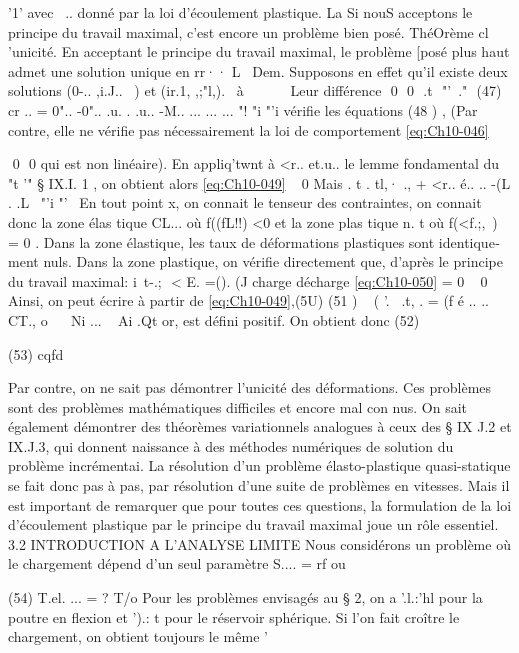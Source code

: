 '1'
avec ~.. donné par la loi d'écoulement plastique.
La 
Si nouS acceptons le principe du travail maximal, c'est encore 
un problème bien posé. 
ThéOrème cl 'unicité. En acceptant le principe du travail maximal, le problème [posé plus haut admet une solution unique en rr·· 
L~ 
Dem. Supposons en effet qu'il existe deux solutions (0-.. ,i.J..~ ) et (ir.1, ,;"l,).
~à ~ ~~ ~ 
Leur différence 
 0  0  .t  "'\
." 
(47) cr .. = 0".. -0".. .u. . .u.. -M.. 
... ... ...
"! "i "'i 
vérifie les équations 
(48 ) , 
(Par contre, elle ne vérifie pas nécessairement la loi de comportement \eqref{eq:Ch10-046} 

 0  0 
qui est non linéaire). En appliq'twnt à <r.. et.u.. le lemme fondamental du "t '" 
§ IX.I. 1 , on obtient alors 
\eqref{eq:Ch10-049} ~ 0 Mais 
. t . tl,· .,
+ <r.. é.. .. -(L . 
.L~ "'i "'~ 
En tout point x, on connait le tenseur des contraintes, on connait donc la 
zone élas tique CL... où f((fL!!) <0 et la zone plas tique n. t où f(<f.;,~) = 0 . 
Dans la zone élastique, les taux de déformations plastiques sont identique­
ment nuls. Dans la zone plastique, on vérifie directement que, d'après le 
principe du travail maximal: 
i\
t-.;  < E. =(). 
(J 
charge décharge 
\eqref{eq:Ch10-050} = 0 ~ 0 
Ainsi, on peut écrire à partir de \eqref{eq:Ch10-049},(5U) 
(51 ) 
~
( 
'.~ .t, . 
= (f é .. .. CT., o
~~ Ni ... ~ Ai
.Qt 
or, est défini positif. On obtient donc 
(52) 

(53) 
cqfd 


Par contre, on ne sait pas démontrer l'unicité des déformations. 
Ces problèmes sont des problèmes mathématiques difficiles et encore mal con­
nus. 
On sait également démontrer des théorèmes variationnels analogues à ceux des § IX J.2 et IX.J.3, qui donnent naissance à des méthodes numéri­ques de solution du problème incrémentai. La résolution d'un problème élas­to-plastique quasi-statique se fait donc pas à pas, par résolution d'une suite de problèmes en vitesses. Mais il est important de remarquer que pour toutes ces questions, la formulation de la loi d'écoulement plastique par le principe du travail maximal joue un rôle essentiel. 
3.2 INTRODUCTION A L'ANALYSE LIMITE 
Nous considérons un problème où le chargement dépend d'un seul paramètre 
S.... = rf ou 

(54)  T.el. ...  =  ? T/o  
Pour les problèmes envisagés  au  §  2,  on  a  '.l.:'hl  pour  la  poutre  en  flexion  
et ').: t  pour le réservoir sphérique.  
Si  l'on fait croître le chargement,  on  obtient  toujours  le même  
' 

